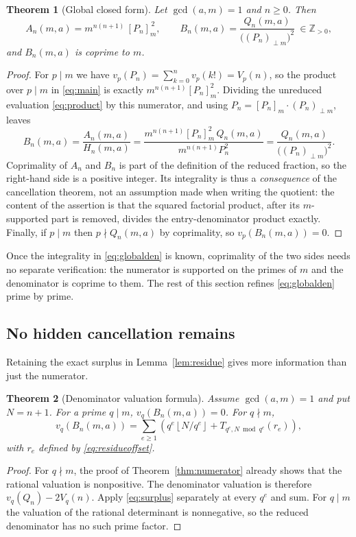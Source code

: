 \documentclass[11pt,a4paper]{article}
\numberwithin{equation}{section}
\newtheorem{theorem}{Theorem}[section]
\theoremstyle{definition}
\theoremstyle{remark}
\newcommand{\Z}{\mathbb{Z}}
\newcommand{\floor}[1]{\left\lfloor#1\right\rfloor}
\begin{document}
\begin{theorem}[Global closed form]\label{thm:globalden}
Let $\gcd(a,m)=1$ and $n\geq0$. Then
\begin{equation}\label{eq:globalden}
 A_n(m,a)=m^{n(n+1)}\,[P_n]_m^{\,2},
 \qquad
 B_n(m,a)=\frac{Q_n(m,a)}{\bigl((P_n)_{\perp m}\bigr)^2}\ \in\Z_{>0},
\end{equation}
and $B_n(m,a)$ is coprime to $m$.
\end{theorem}
\begin{proof}
For $p\mid m$ we have $v_p(P_n)=\sum_{k=0}^n v_p(k!)=V_p(n)$, so the product over $p\mid m$ in \eqref{eq:main} is exactly $m^{n(n+1)}[P_n]_m^2$. Dividing the unreduced evaluation \eqref{eq:product} by this numerator, and using $P_n=[P_n]_m\cdot(P_n)_{\perp m}$, leaves
\[
 B_n(m,a)=\frac{A_n(m,a)}{H_n(m,a)}
 =\frac{m^{n(n+1)}[P_n]_m^2\,Q_n(m,a)}{m^{n(n+1)}P_n^2}
 =\frac{Q_n(m,a)}{\bigl((P_n)_{\perp m}\bigr)^2}.
\]
Coprimality of $A_n$ and $B_n$ is part of the definition of the reduced fraction, so the right-hand side is a positive integer. Its integrality is thus a \emph{consequence} of the cancellation theorem, not an assumption made when writing the quotient: the content of the assertion is that the squared factorial product, after its $m$-supported part is removed, divides the entry-denominator product exactly. Finally, if $p\mid m$ then $p\nmid Q_n(m,a)$ by coprimality, so $v_p(B_n(m,a))=0$.
\end{proof}

Once the integrality in \eqref{eq:globalden} is known, coprimality of the two sides needs no separate verification: the numerator is supported on the primes of $m$ and the denominator is coprime to them. The rest of this section refines \eqref{eq:globalden} prime by prime.

\subsection{No hidden cancellation remains}
Retaining the exact surplus in Lemma~\ref{lem:residue} gives more information than just the numerator.

\begin{theorem}[Denominator valuation formula]\label{thm:denval}
Assume $\gcd(a,m)=1$ and put $N=n+1$. For a prime $q\mid m$, $v_q(B_n(m,a))=0$. For $q\nmid m$,
\begin{equation}\label{eq:denval}
 v_q(B_n(m,a))=
 \sum_{e\geq1}\left(
 q^e\floor{N/q^e}
 +T_{q^e,N\bmod q^e}(r_e)\right),
\end{equation}
with $r_e$ defined by \eqref{eq:residueoffset}.
\end{theorem}
\begin{proof}
For $q\nmid m$, the proof of Theorem~\ref{thm:numerator} already shows that the rational valuation is nonpositive. The denominator valuation is therefore
$v_q(Q_n)-2V_q(n)$. Apply \eqref{eq:surplus} separately at every $q^e$ and sum. For $q\mid m$ the valuation of the rational determinant is nonnegative, so the reduced denominator has no such prime factor.
\end{proof}
\end{document}
